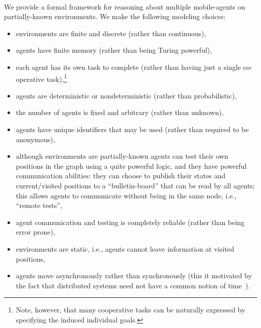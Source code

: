\

We provide a formal framework for reasoning about multiple mobile-agents on partially-known environments. 
We make the following modeling choices:
\begin{itemize}
 \item environments are finite and discrete (rather than continuous),
 \item agents have finite memory (rather than being Turing powerful),
 \item each agent has its own task to complete (rather than having just a single co-operative task),\footnote{Note, however, that many cooperative tasks can be naturally expressed by specifying the induced individual goals.}
 \item agents are deterministic or nondeterministic (rather than probabilistic),
 \item the number of agents is fixed and arbitrary (rather than unknown),
 \item agents have unique identifiers that may be used (rather than required to be anonymous),
 \item although environments are partially-known agents can test their own positions in the graph using a quite powerful logic, and they have powerful communication abilities: they can choose to publish their states and current/visited positions to a ``bulletin-board'' that can be read by all agents; this allows agents to communicate without being in the same node, i.e., ``remote tests'',
 \item agent communication and testing is completely reliable (rather than being error prone),
 \item environments are static, i.e., agents cannot leave information at visited positions,
 \item agents move asynchronously rather than synchronously (this it motivated by the fact that distributed systems need not have a common notion of time~\cite{Lynch96}).
\end{itemize}


